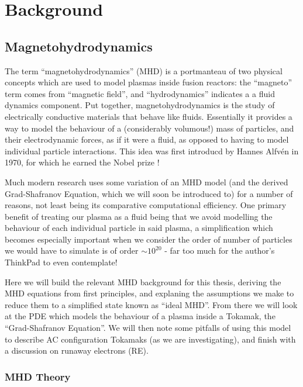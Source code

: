 
\chapter{Background}
\label{chapter2}

\section{Magnetohydrodynamics}


The term ``magnetohydrodynamics'' (MHD) is a portmanteau of two physical concepts which are used to model plasmas 
inside fusion reactors: the ``magneto'' term comes from ``magnetic field'', and ``hydrodynamics'' indicates a 
a fluid dynamics component. Put together, magnetohydrodynamics is the study of electrically conductive materials 
that behave like fluids. Essentially it provides a way to model the behaviour of a (considerably volumous!) 
mass of particles, and their electrodynamic forces, as if it were a fluid, as opposed to having to model 
individual particle interactions. This idea was first introducd by Hannes Alfv\'en in 1970, for which he earned 
the Nobel prize \cite{alfven-mhd}!

Much modern research uses some variation of an MHD model (and the derived Grad-Shafranov Equation, which we will 
soon be introduced to) for a number of reasons, not least being its comparative computational efficiency.
One primary benefit of treating our plasma as a fluid being that we avoid modelling the behaviour of 
each individual particle in said plasma, a simplification which becomes especially important when we consider 
the order of number of particles we would have to simulate is of order $\sim 10^{20}$ - far too much 
for the author's ThinkPad to even contemplate!

Here we will build the relevant MHD background for this thesis, deriving the MHD equations from first principles, 
and explaning the assumptions we make to reduce them to a simplified state known as ``ideal MHD''. From there we will 
look at the PDE which models the behaviour of a plasma inside a Tokamak, the ``Grad-Shafranov Equation''. We will 
then note some pitfalls of using this model to describe AC configuration Tokamaks (as we are investigating), 
and finish with a discussion on runaway electrons (RE).

\subsection{MHD Theory}


